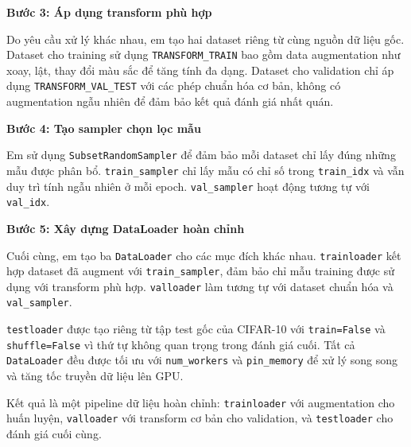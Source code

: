 \documentclass[12pt, a4paper, openany]{report}
\begin{document}
\noindent\textbf{Bước 3: Áp dụng transform phù hợp} 

Do yêu cầu xử lý khác nhau, em tạo hai dataset riêng từ cùng nguồn dữ liệu gốc. Dataset cho training sử dụng \texttt{TRANSFORM\_TRAIN} bao gồm data augmentation như xoay, lật, thay đổi màu sắc để tăng tính đa dạng. Dataset cho validation chỉ áp dụng \texttt{TRANSFORM\_VAL\_TEST} với các phép chuẩn hóa cơ bản, không có augmentation ngẫu nhiên để đảm bảo kết quả đánh giá nhất quán.

\noindent\textbf{Bước 4: Tạo sampler chọn lọc mẫu} 

Em sử dụng \texttt{SubsetRandomSampler} để đảm bảo mỗi dataset chỉ lấy đúng những mẫu được phân bổ. \texttt{train\_sampler} chỉ lấy mẫu có chỉ số trong \texttt{train\_idx} và vẫn duy trì tính ngẫu nhiên ở mỗi epoch. \texttt{val\_sampler} hoạt động tương tự với \texttt{val\_idx}.

\noindent\textbf{Bước 5: Xây dựng DataLoader hoàn chỉnh} 

Cuối cùng, em tạo ba \texttt{DataLoader} cho các mục đích khác nhau. \texttt{trainloader} kết hợp dataset đã augment với \texttt{train\_sampler}, đảm bảo chỉ mẫu training được sử dụng với transform phù hợp. \texttt{valloader} làm tương tự với dataset chuẩn hóa và \texttt{val\_sampler}.

\texttt{testloader} được tạo riêng từ tập test gốc của CIFAR-10 với \texttt{train=False} và \texttt{shuffle=False} vì thứ tự không quan trọng trong đánh giá cuối. Tất cả \texttt{DataLoader} đều được tối ưu với \texttt{num\_workers} và \texttt{pin\_memory} để xử lý song song và tăng tốc truyền dữ liệu lên GPU.

Kết quả là một pipeline dữ liệu hoàn chỉnh: \texttt{trainloader} với augmentation cho huấn luyện, \texttt{valloader} với transform cơ bản cho validation, và \texttt{testloader} cho đánh giá cuối cùng.
\end{document}
